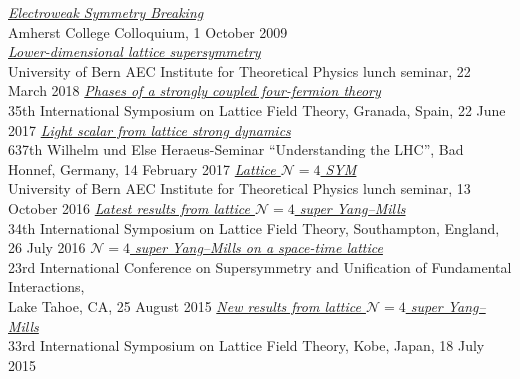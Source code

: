 \begin{spacelistout}
\begin{revnumerate}
      \textit{\href{http://www.davidschaich.net/talks/EWSB.pdf}{Electroweak Symmetry Breaking}} \\
      Amherst College Colloquium, 1 October 2009 \\
%
%
%
\vspace{18 pt}
\hspace{-22 pt}{\large \bfseries Contributed talks} \vspace{-8 pt}
    \pagebreakitem
      \textit{\href{http://www.davidschaich.net/talks/1803Bern.pdf}{Lower-dimensional lattice supersymmetry}} \\
      University of Bern AEC Institute for Theoretical Physics lunch seminar, 22 March 2018
    \pagebreakitem
      \textit{\href{http://www.davidschaich.net/talks/lattice17.pdf}{Phases of a strongly coupled four-fermion theory}} \\
      35th International Symposium on Lattice Field Theory, Granada, Spain, 22 June 2017
    \pagebreakitem
      \textit{\href{http://www.davidschaich.net/talks/1702BadHonnef.pdf}{Light scalar from lattice strong dynamics}} \\
      637th Wilhelm und Else Heraeus-Seminar ``Understanding the LHC'', Bad Honnef, Germany, 14 February 2017
    \pagebreakitem
      \textit{\href{http://www.davidschaich.net/talks/latticeN4_Bern.pdf}{Lattice $\mathcal N = 4$ SYM}} \\
      University of Bern AEC Institute for Theoretical Physics lunch seminar, 13 October 2016
    \pagebreakitem
      \textit{\href{http://www.davidschaich.net/talks/lattice16.pdf}{Latest results from lattice $\mathcal N = 4$ super Yang--Mills}} \\
      34th International Symposium on Lattice Field Theory, Southampton, England, 26 July 2016
    \pagebreakitem
      \textit{\href{http://www.davidschaich.net/talks/SUSY15.pdf}{$\mathcal N = 4$ super Yang--Mills on a space-time lattice}} \\
      23rd International Conference on Supersymmetry and Unification of Fundamental Interactions, \\ Lake Tahoe, CA, 25 August 2015
    \pagebreakitem
      \textit{\href{http://www.davidschaich.net/talks/lattice15.pdf}{New results from lattice $\mathcal N = 4$ super Yang--Mills}} \\
      33rd International Symposium on Lattice Field Theory, Kobe, Japan, 18 July 2015

\end{revnumerate}
\end{spacelistout}
